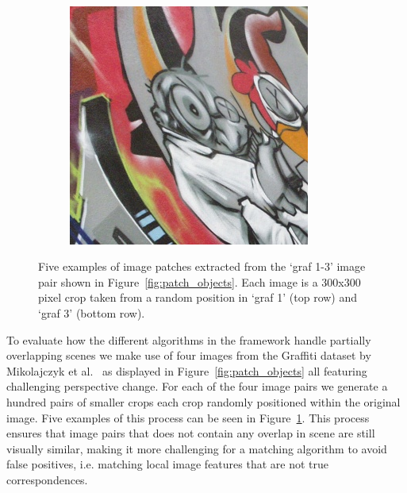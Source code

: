\documentclass[review]{elsarticle}
\begin{document}
\begin{figure}[htb]
\begin{subfigure}[t]{0.16\columnwidth}
    \end{subfigure}%
    ~~ %
    \begin{subfigure}[t]{0.16\columnwidth}
        \centering
        \includegraphics[width=1\columnwidth]{images/acr/patches/patch_5_2}
    \end{subfigure}%
    \caption{Five examples of image patches extracted from the `graf 1-3' image pair shown in Figure~\ref{fig:patch_objects}. Each image is a 300x300 pixel crop taken from a random position in `graf 1' (top row) and `graf 3' (bottom row).}
    \label{fig:patch_examples}
\end{figure}

To evaluate how the different algorithms in the framework handle partially overlapping scenes we make use of four images from the Graffiti dataset by Mikolajczyk et al.\ \cite{mikolajczyk2005performance} as displayed in Figure\ \ref{fig:patch_objects} all featuring challenging perspective change. For each of the four image pairs we generate a hundred pairs of smaller crops each crop randomly positioned within the original image. Five examples of this process can be seen in Figure~\ref{fig:patch_examples}. This process ensures that image pairs that does not contain any overlap in scene are still visually similar, making it more challenging for a matching algorithm to avoid false positives, i.e. matching local image features that are not true correspondences.
\end{document}
